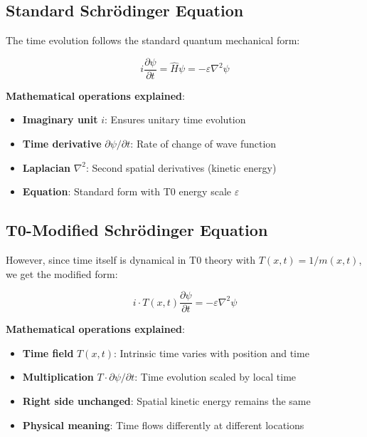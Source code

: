 \documentclass[12pt,a4paper]{article}
\theoremstyle{definition}
\theoremstyle{remark}
\begin{document}
	\subsection{Standard Schrödinger Equation}
	
	The time evolution follows the standard quantum mechanical form:
	
	\begin{equation}
		i\frac{\partial\psi}{\partial t} = \hat{H}\psi = -\varepsilon \nabla^2 \psi
		\label{eq:standard_schrodinger_t0}
	\end{equation}
	
	\textbf{Mathematical operations explained}:
	\begin{itemize}
		\item \textbf{Imaginary unit} $i$: Ensures unitary time evolution
		\item \textbf{Time derivative} $\partial\psi/\partial t$: Rate of change of wave function
		\item \textbf{Laplacian} $\nabla^2$: Second spatial derivatives (kinetic energy)
		\item \textbf{Equation}: Standard form with T0 energy scale $\varepsilon$
	\end{itemize}
	
	\subsection{T0-Modified Schrödinger Equation}
	
	However, since time itself is dynamical in T0 theory with $T(x,t) = 1/m(x,t)$, we get the modified form:
	
	\begin{equation}
		\boxed{i \cdot T(x,t) \frac{\partial\psi}{\partial t} = -\varepsilon \nabla^2 \psi}
		\label{eq:t0_modified_schrodinger}
	\end{equation}
	
	\textbf{Mathematical operations explained}:
	\begin{itemize}
		\item \textbf{Time field} $T(x,t)$: Intrinsic time varies with position and time
		\item \textbf{Multiplication} $T \cdot \partial\psi/\partial t$: Time evolution scaled by local time
		\item \textbf{Right side unchanged}: Spatial kinetic energy remains the same
		\item \textbf{Physical meaning}: Time flows differently at different locations
	\end{itemize}
	
\end{document}
